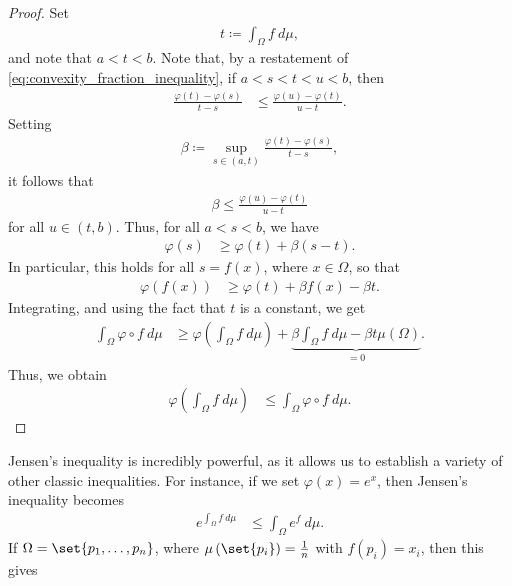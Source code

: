 \documentclass[12pt]{mypackage}
\begin{document}
\begin{proof}
  Set
  \begin{align*}
    t\coloneq \int_{\Omega}^{} f\:d\mu,
  \end{align*}
  and note that $a < t < b$. Note that, by a restatement of \eqref{eq:convexity_fraction_inequality}, if $a < s < t < u < b$, then
  \begin{align*}
    \frac{\varphi\left( t \right) - \varphi\left( s \right)}{t-s} &\leq \frac{\varphi\left( u \right)- \varphi\left( t \right)}{u-t}.
  \end{align*}
  Setting
  \begin{align*}
    \beta\coloneq \sup_{s\in (a,t)} \frac{\varphi\left( t \right) - \varphi\left( s \right)}{t-s},
  \end{align*}
  it follows that
  \begin{align*}
    \beta \leq \frac{\varphi\left( u \right)-\varphi\left( t \right)}{u-t}
  \end{align*}
  for all $u\in (t,b)$. Thus, for all $a < s < b$, we have
  \begin{align*}
    \varphi\left( s \right) &\geq \varphi\left( t \right) + \beta\left( s-t \right).
  \end{align*}
  In particular, this holds for all $s = f(x)$, where $x\in \Omega$, so that
  \begin{align*}
    \varphi\left( f\left( x \right) \right) &\geq \varphi\left( t \right) + \beta f(x) - \beta t.
  \end{align*}
  Integrating, and using the fact that $t$ is a constant, we get
  \begin{align*}
    \int_{\Omega}^{} \varphi\circ f\:d\mu &\geq \varphi\left( \int_{\Omega}^{} f\:d\mu \right) + \underbrace{\beta \int_{\Omega}^{} f\:d\mu - \beta t\mu\left( \Omega \right)}_{=0}.
  \end{align*}
  Thus, we obtain
  \begin{align*}
    \varphi\left( \int_{\Omega}^{} f\:d\mu \right) &\leq \int_{\Omega}^{} \varphi\circ f\:d\mu.
  \end{align*}
\end{proof}
Jensen's inequality is incredibly powerful, as it allows us to establish a variety of other classic inequalities. For instance, if we set $\varphi(x) = e^x$, then Jensen's inequality becomes
\begin{align*}
  e^{\int_{\Omega}^{} f\:d\mu} &\leq \int_{\Omega}^{} e^{f}\:d\mu.
\end{align*}
If $\Omega = \set{p_1,\dots,p_n}$, where $\mu\left( \set{p_i} \right) = \frac{1}{n}$ with $f\left(p_i\right) = x_i$, then this gives
\end{document}
